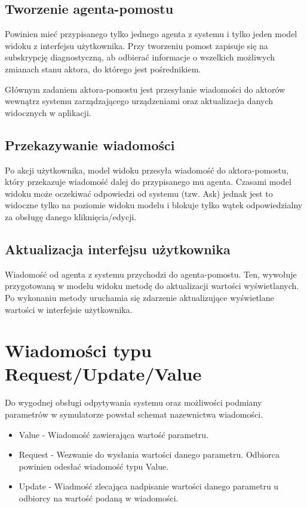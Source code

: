 {\subsection*{Tworzenie agenta-pomostu}
Powinien mieć przypisanego tylko jednego agenta z systemu i tylko jeden model widoku z interfejsu użytkownika. Przy tworzeniu pomost zapisuje się na subskrypcję diagnostyczną, ab odbierać informacje o wszelkich możliwych zmianach stanu aktora, do którego jest pośrednikiem.


Głównym zadaniem aktora-pomostu jest przesyłanie wiadomości do aktorów wewnątrz systemu zarządzającego urządzeniami oraz aktualizacja danych widocznych w aplikacji.

\subsection*{Przekazywanie wiadomości}

Po akcji użytkownika, model widoku przesyła wiadomość do aktora-pomostu, który przekazuje wiadomość dalej do przypisanego mu agenta. Czasami model widoku może oczekiwać odpowiedzi od systemu (tzw. Ask) jednak jest to widoczne tylko na poziomie widoku modelu i blokuje tylko wątek odpowiedzialny za obsługę danego kliknięcia/edycji.

\subsection*{Aktualizacja interfejsu użytkownika}

Wiadomość od agenta z systemu przychodzi do agenta-pomostu. Ten, wywołuje przygotowaną w modelu widoku metodę do aktualizacji wartości wyświetlanych.
Po wykonaniu metody uruchamia się zdarzenie aktualizujące wyświetlane wartości w interfejsie użytkownika.

\section{Wiadomości typu Request/Update/Value}
Do wygodnej obsługi odpytywania systemu oraz możliwości podmiany parametrów w symulatorze powstał schemat nazewnictwa wiadomości.
\begin{itemize}
    \item Value - Wiadomość zawierająca wartość parametru.
    \item Request - Wezwanie do wysłania wartości danego parametru. Odbiorca powinien odesłać wiadomość typu Value.
    \item Update - Wiadmość zlecająca nadpisanie wartości danego parametru u odbiorcy na wartość podaną w wiadomości.
\end{itemize}


}
